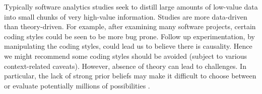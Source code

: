 \documentclass[10pt]{elsarticle}
\newcommand{\RED}{\color{black}}
\newcommand{\BLACK}{\color{black}}
\begin{document}
Typically software analytics studies seek to distill large amounts of low-value data into small chunks of very high-value information. Studies are more data-driven than theory-driven.  For example, after examining many software projects, certain coding styles could be seen to be more bug prone.  Follow up experimentation, by manipulating the coding styles, could lead us to believe there is causality. Hence we might recommend some coding styles should be avoided (subject to various context-related caveats). \RED However, absence of theory can lead to challenges.  In particular, the lack of strong prior beliefs may make it difficult to choose between or evaluate potentially millions of possibilities \cite{Gust93,Deva16}.  \BLACK



\end{document}
